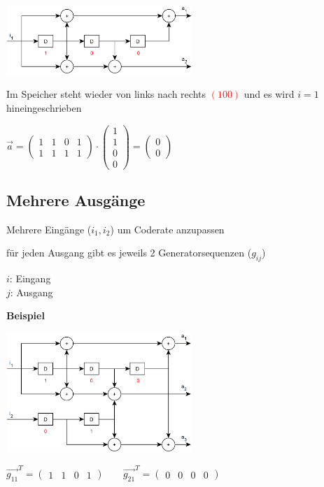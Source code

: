 \includegraphics[width=7cm]{img/faltungscoder1in2out.PNG}

Im Speicher steht wieder von links nach rechts \textcolor{red}{$ (1 0 0) $} und es wird $i = 1$ hineingeschrieben

$\displaystyle{
    \vec{a} =
    \begin{pmatrix}
        1 & 1 & 0 & 1\\
        1 & 1 & 1 & 1
    \end{pmatrix}
    \cdot
    \begin{pmatrix}
        1\\
        1\\
        0\\
        0
    \end{pmatrix} =
    \begin{pmatrix}
        0\\
        0
    \end{pmatrix}
}$

\subsection{Mehrere Ausgänge}

Mehrere Eingänge ($i_1, i_2$) um Coderate anzupassen

für jeden Ausgang gibt es jeweils 2 Generatorsequenzen ($g_{ij}$)

$i$: Eingang\\
$j$: Ausgang

\textbf{Beispiel}

\includegraphics[width=7cm]{img/faltungscoder2in3out.PNG}

$\displaystyle{
    \vec{g_{11}}^T = \begin{pmatrix}
        1 & 1 & 0 & 1
    \end{pmatrix}
    \;\;\;\;\;\;\;
    \vec{g_{21}}^T = \begin{pmatrix}
        0 & 0 & 0 & 0
    \end{pmatrix}
}$

